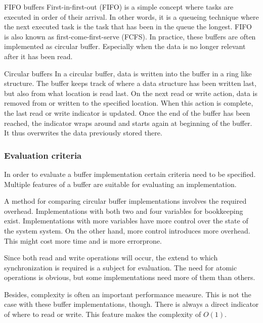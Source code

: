 \begin{homeworkProblem}
\label{sec:lid_stud} 

\begin{homeworkSection}{FIFO buffers}
	First-in-first-out (FIFO) is a simple concept where tasks are executed in order of their arrival. In other words, it is a queueing technique where the next executed task is the task that has been in the queue the longest. 
	FIFO is also known as first-come-first-serve (FCFS).
	In practice, these buffers are often implemented as circular buffer. Especially when the data is no longer relevant after it has been read.
\end{homeworkSection}

\begin{homeworkSection}{Circular buffers}
	In a circular buffer, data is written into the buffer in a ring like structure. The buffer keeps track of where a data structure has been written last, but also from what location is read last. 
	On the next read or write action, data is removed from or written to the specified location. 
	When this action is complete, the last read or write indicator is updated. 
	Once the end of the buffer has been reached, the indicator wraps around and starts again at beginning of the buffer. It thus overwrites the data previously stored there.

\subsubsection{Evaluation criteria}
	In order to evaluate a buffer implementation certain criteria need to be specified. Multiple features of a buffer are suitable for evaluating an implementation.
	
	A method for comparing circular buffer implementations involves the required overhead. Implementations with both two and four variables for bookkeeping exist. \cite{buffers} 
	Implementations with more variables have more control over the state of the system system. On the other hand, more control introduces more overhead. This might cost more time and is more errorprone.

	Since both read and write operations will occur, the extend to which synchronization is required is a subject for evaluation. The need for atomic operations is obvious, but some implementations need more of them than others.

	Besides, complexity is often an important performance measure. This is not the case with these buffer implementations, though. There is always a direct indicator of where to read or write. This feature makes the complexity of $O(1)$.


\end{homeworkSection}
\end{homeworkProblem}
